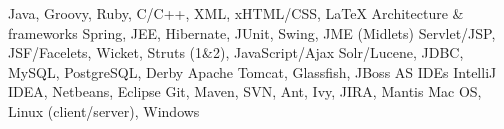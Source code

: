 
\cvcomputer
	{} {Java, Groovy, Ruby, C/C++, XML, xHTML/CSS, \LaTeX}
	{Architecture \& frameworks} {Spring, JEE, Hibernate, JUnit, Swing, JME (Midlets)}
\cvcomputer
	{} {Servlet/JSP, JSF/Facelets, Wicket, Struts (1\&2), JavaScript/Ajax}
	{} {Solr/Lucene, JDBC, MySQL, PostgreSQL, Derby}
\cvcomputer
	{} {Apache Tomcat, Glassfish, JBoss AS}
	{IDEs} {IntelliJ IDEA, Netbeans, Eclipse}
\cvcomputer
	{} {Git, Maven, SVN, Ant, Ivy, JIRA, Mantis}
	{} {Mac OS, Linux (client/server), Windows}
